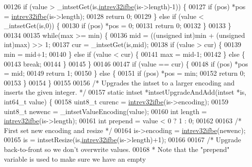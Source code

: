 \begin{DoxyCode}
00126         \textcolor{keywordflow}{if} (value > \_intsetGet(is,\hyperlink{endianconv_8h_a4e85d9ae58a3b1e6ceaabfd4689002c7}{intrev32ifbe}(is->length)-1)) \{
00127             \textcolor{keywordflow}{if} (pos) *pos = \hyperlink{endianconv_8h_a4e85d9ae58a3b1e6ceaabfd4689002c7}{intrev32ifbe}(is->length);
00128             \textcolor{keywordflow}{return} 0;
00129         \} \textcolor{keywordflow}{else} \textcolor{keywordflow}{if} (value < \_intsetGet(is,0)) \{
00130             \textcolor{keywordflow}{if} (pos) *pos = 0;
00131             \textcolor{keywordflow}{return} 0;
00132         \}
00133     \}
00134 
00135     \textcolor{keywordflow}{while}(max >= min) \{
00136         mid = ((\textcolor{keywordtype}{unsigned} \textcolor{keywordtype}{int})min + (\textcolor{keywordtype}{unsigned} \textcolor{keywordtype}{int})max) >> 1;
00137         cur = \_intsetGet(is,mid);
00138         \textcolor{keywordflow}{if} (value > cur) \{
00139             min = mid+1;
00140         \} \textcolor{keywordflow}{else} \textcolor{keywordflow}{if} (value < cur) \{
00141             max = mid-1;
00142         \} \textcolor{keywordflow}{else} \{
00143             \textcolor{keywordflow}{break};
00144         \}
00145     \}
00146 
00147     \textcolor{keywordflow}{if} (value == cur) \{
00148         \textcolor{keywordflow}{if} (pos) *pos = mid;
00149         \textcolor{keywordflow}{return} 1;
00150     \} \textcolor{keywordflow}{else} \{
00151         \textcolor{keywordflow}{if} (pos) *pos = min;
00152         \textcolor{keywordflow}{return} 0;
00153     \}
00154 \}
00155 
00156 \textcolor{comment}{/* Upgrades the intset to a larger encoding and inserts the given integer. */}
00157 \textcolor{keyword}{static} intset *intsetUpgradeAndAdd(intset *is, int64\_t value) \{
00158     uint8\_t curenc = \hyperlink{endianconv_8h_a4e85d9ae58a3b1e6ceaabfd4689002c7}{intrev32ifbe}(is->encoding);
00159     uint8\_t newenc = \_intsetValueEncoding(value);
00160     \textcolor{keywordtype}{int} length = \hyperlink{endianconv_8h_a4e85d9ae58a3b1e6ceaabfd4689002c7}{intrev32ifbe}(is->length);
00161     \textcolor{keywordtype}{int} prepend = value < 0 ? 1 : 0;
00162 
00163     \textcolor{comment}{/* First set new encoding and resize */}
00164     is->encoding = \hyperlink{endianconv_8h_a4e85d9ae58a3b1e6ceaabfd4689002c7}{intrev32ifbe}(newenc);
00165     is = intsetResize(is,\hyperlink{endianconv_8h_a4e85d9ae58a3b1e6ceaabfd4689002c7}{intrev32ifbe}(is->length)+1);
00166 
00167     \textcolor{comment}{/* Upgrade back-to-front so we don't overwrite values.}
00168 \textcolor{comment}{     * Note that the "prepend" variable is used to make sure we have an empty}

\end{DoxyCode}
